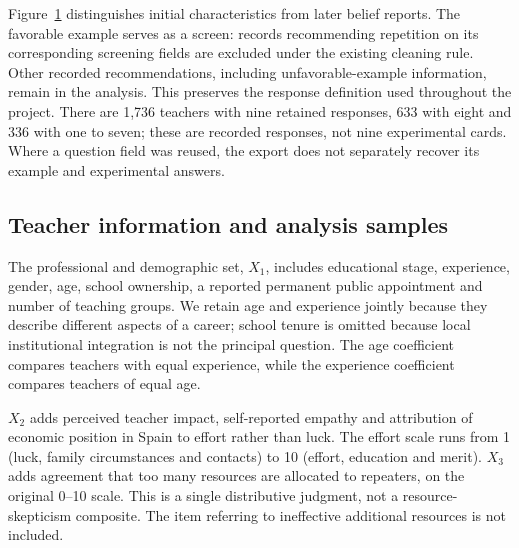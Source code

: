 \begin{figure}[!htbp]\centering\color{revised}
\caption{}\label{fig:timeline}
\end{figure}
Figure~\ref{fig:timeline} distinguishes initial characteristics from later belief reports. The favorable example serves as a screen: records recommending repetition on its corresponding screening fields are excluded under the existing cleaning rule. Other recorded recommendations, including unfavorable-example information, remain in the analysis. This preserves the response definition used throughout the project. There are 1,736 teachers with nine retained responses, 633 with eight and 336 with one to seven; these are recorded responses, not nine experimental cards. Where a question field was reused, the export does not separately recover its example and experimental answers.

\subsection{Teacher information and analysis samples}
The professional and demographic set, $X_1$, includes educational stage, experience, gender, age, school ownership, a reported permanent public appointment and number of teaching groups. We retain age and experience jointly because they describe different aspects of a career; school tenure is omitted because local institutional integration is not the principal question. The age coefficient compares teachers with equal experience, while the experience coefficient compares teachers of equal age.

$X_2$ adds perceived teacher impact, self-reported empathy and attribution of economic position in Spain to effort rather than luck. The effort scale runs from 1 (luck, family circumstances and contacts) to 10 (effort, education and merit). $X_3$ adds agreement that too many resources are allocated to repeaters, on the original 0--10 scale. This is a single distributive judgment, not a resource-skepticism composite. The item referring to ineffective additional resources is not included.

